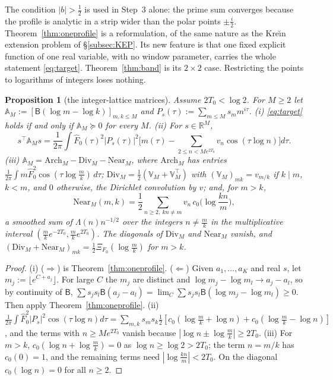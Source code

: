 \documentclass[11pt]{amsart}
\newtheorem{proposition}[theorem]{Proposition}
\theoremstyle{definition}
\theoremstyle{remark}
\newcommand{\R}{\mathbb R}
\newcommand{\Fh}{\widehat F}
\begin{document}
The condition $|b|>\frac12$ is used in Step~3 alone: the prime sum converges because the profile is analytic in a strip wider
than the polar points $\pm\frac i2$. Theorem~\ref{thm:oneprofile} is a reformulation, of the same nature as the Kre\u{\i}n
extension problem of \S\ref{subsec:KEP}. Its new feature is that one fixed explicit function of one real variable, with no window
parameter, carries the whole statement \eqref{eq:target}. Theorem~\ref{thm:band} is its $2\times2$ case. Restricting the points to
logarithms of integers loses nothing.

\begin{proposition}[the integer-lattice matrices]\label{prop:AM}
Assume $2T_0<\log2$. For $M\ge2$ let $\mathbb A_M:=[\mathsf B(\log m-\log k)]_{m,k\le M}$ and $P_s(\tau):=\sum_{m\le M}s_mm^{i\tau}$.
\emph{(i)} \eqref{eq:target} holds if and only if $\mathbb A_M\succeq0$ for every $M$.
\emph{(ii)} For $s\in\R^M$,
\[
s^\top\mathbb A_Ms=\frac1{2\pi}\int\Fh_0(\tau)^2|P_s(\tau)|^2\Big[m(\tau)-\sum_{2\le n<Me^{2T_0}}v_n\cos(\tau\log n)\Big]d\tau .
\]
\emph{(iii)} $\mathbb A_M=\mathrm{Arch}_M-\mathrm{Div}_M-\mathrm{Near}_M$, where $\mathrm{Arch}_M$ has entries
$\frac1{2\pi}\int m\Fh_0^2\cos(\tau\log\frac mk)\,d\tau$; $\mathrm{Div}_M=\frac12(\mathbb V_M+\mathbb V_M^\top)$ with $(\mathbb V_M)_{mk}=v_{m/k}$ if $k\mid m$,
$k<m$, and $0$ otherwise, the Dirichlet convolution by $v$; and, for $m>k$,
\[
\mathrm{Near}_M(m,k)=\frac12\sum_{n\ge2,\ kn\ne m}v_n\,c_0\Big(\log\frac{kn}m\Big),
\]
a smoothed sum of $\Lambda(n)n^{-1/2}$ over the integers $n\ne\frac mk$ in the multiplicative interval
$(\frac mke^{-2T_0},\frac mke^{2T_0})$. The diagonals of $\mathrm{Div}_M$ and $\mathrm{Near}_M$ vanish, and
$(\mathrm{Div}_M+\mathrm{Near}_M)_{mk}=\frac12\Xi_{F_0}(\log\frac mk)$ for $m>k$.
\end{proposition}

\begin{proof}
(i) ($\Rightarrow$) is Theorem~\ref{thm:oneprofile}. ($\Leftarrow$) Given $a_1,\dots,a_K$ and real $s$, let $m_j:=\lfloor e^{C+a_j}\rfloor$. For large
$C$ the $m_j$ are distinct and $\log m_j-\log m_l\to a_j-a_l$, so by continuity of $\mathsf B$,
$\sum s_js_l\mathsf B(a_j-a_l)=\lim_C\sum s_js_l\mathsf B(\log m_j-\log m_l)\ge0$. Then apply Theorem~\ref{thm:oneprofile}.
(ii) $\frac1{2\pi}\int\Fh_0^2|P_s|^2\cos(\tau\log n)d\tau=\sum_{m,k}s_ms_k\frac12[c_0(\log\frac mk+\log n)+c_0(\log\frac mk-\log n)]$, and the
terms with $n\ge Me^{2T_0}$ vanish because $|\log n\pm\log\frac mk|\ge2T_0$. (iii) For $m>k$, $c_0(\log n+\log\frac mk)=0$ as
$\log n\ge\log2>2T_0$; the term $n=m/k$ has $c_0(0)=1$, and the remaining terms need $|\log\frac{kn}m|<2T_0$. On the diagonal
$c_0(\log n)=0$ for all $n\ge2$.
\end{proof}
\end{document}
